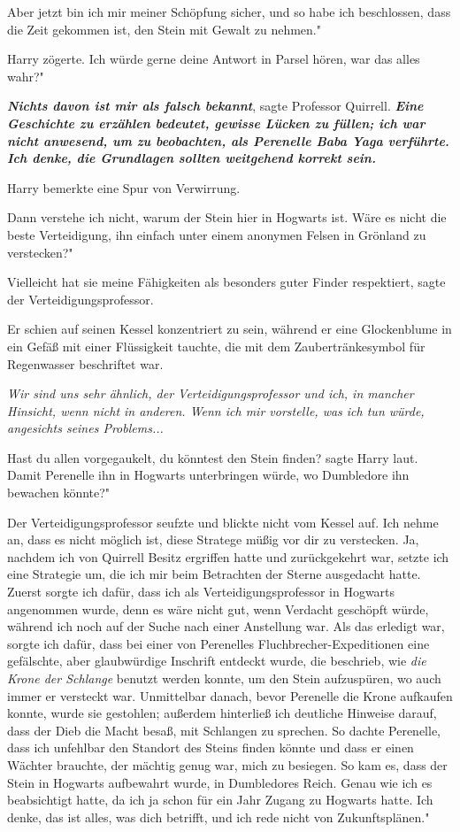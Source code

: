 \glqq{}Aber jetzt bin ich mir meiner Schöpfung sicher, und so habe ich
beschlossen, dass die Zeit gekommen ist, den Stein mit Gewalt zu nehmen."

Harry zögerte. \glqq{}Ich würde gerne deine Antwort in Parsel hören, war das
alles wahr?"

\glqq{}\textbf{\emph{Nichts davon ist mir als falsch bekannt}}\grqq{}, sagte
Professor Quirrell. \glqq{}\textbf{\emph{Eine Geschichte zu erzählen bedeutet,
gewisse Lücken zu füllen; ich war nicht anwesend, um zu beobachten, als
Perenelle Baba Yaga verführte. Ich denke, die Grundlagen sollten weitgehend
korrekt sein.\grqq{}} }

Harry bemerkte eine Spur von Verwirrung.

\glqq{}Dann verstehe ich nicht, warum der Stein hier in Hogwarts ist. Wäre es
nicht die beste Verteidigung, ihn einfach unter einem anonymen Felsen in
Grönland zu verstecken?"

\glqq{}Vielleicht hat sie meine Fähigkeiten als besonders guter Finder
respektiert\grqq{}, sagte der Verteidigungsprofessor.

Er schien auf seinen Kessel konzentriert zu sein, während er eine Glockenblume
in ein Gefäß mit einer Flüssigkeit tauchte, die mit dem Zaubertränkesymbol für
Regenwasser beschriftet war.

\emph{Wir sind uns sehr ähnlich, der Verteidigungsprofessor und ich, in mancher
Hinsicht, wenn nicht in anderen. Wenn ich mir vorstelle, was ich tun würde,
angesichts seines Problems...}

\glqq{}Hast du allen vorgegaukelt, du könntest den Stein finden?\grqq{} sagte
Harry laut. \glqq{}Damit Perenelle ihn in Hogwarts unterbringen würde, wo
Dumbledore ihn bewachen könnte?"

Der Verteidigungsprofessor seufzte und blickte nicht vom Kessel auf. \glqq{}Ich
nehme an, dass es nicht möglich ist, diese Stratege müßig vor dir zu verstecken.
Ja, nachdem ich von Quirrell Besitz ergriffen hatte und zurückgekehrt war,
setzte ich eine Strategie um, die ich mir beim Betrachten der Sterne ausgedacht
hatte. Zuerst sorgte ich dafür, dass ich als Verteidigungsprofessor in Hogwarts
angenommen wurde, denn es wäre nicht gut, wenn Verdacht geschöpft würde, während
ich noch auf der Suche nach einer Anstellung war. Als das erledigt war, sorgte
ich dafür, dass bei einer von Perenelles Fluchbrecher-Expeditionen eine
gefälschte, aber glaubwürdige Inschrift entdeckt wurde, die beschrieb, wie
\emph{die Krone der Schlange} benutzt werden konnte, um den Stein aufzuspüren,
wo auch immer er versteckt war. Unmittelbar danach, bevor Perenelle die Krone
aufkaufen konnte, wurde sie gestohlen; außerdem hinterließ ich deutliche
Hinweise darauf, dass der Dieb die Macht besaß, mit Schlangen zu sprechen. So
dachte Perenelle, dass ich unfehlbar den Standort des Steins finden könnte und
dass er einen Wächter brauchte, der mächtig genug war, mich zu besiegen. So kam
es, dass der Stein in Hogwarts aufbewahrt wurde, in Dumbledores Reich. Genau wie
ich es beabsichtigt hatte, da ich ja schon für ein Jahr Zugang zu Hogwarts
hatte. Ich denke, das ist alles, was dich betrifft, und ich rede nicht von
Zukunftsplänen."

